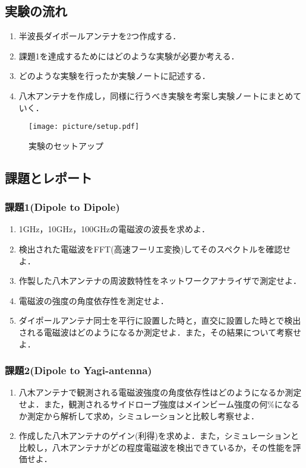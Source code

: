 \documentclass[a4j,10pt,oneside,openany]{jsbook}
\begin{document}
{\subsection{実験の流れ}
\begin{enumerate}[1．]
  \item 半波長ダイポールアンテナを2つ作成する．
  \item 課題1を達成するためにはどのような実験が必要か考える．
  \item どのような実験を行ったか実験ノートに記述する．
  \item 八木アンテナを作成し，同様に行うべき実験を考案し実験ノートにまとめていく．
\end{enumerate}

\begin{figure}[htbp]
  \begin{center}
    \texttt{[image: picture/setup.pdf]}
    \caption{実験のセットアップ}
    \label{fig:setup}
  \end{center}
\end{figure}

\subsection{課題とレポート}
\subsubsection{課題1(Dipole to Dipole)}
\begin{enumerate}[(1)]
  \item 1GHz，10GHz，100GHzの電磁波の波長を求めよ．
  \item 検出された電磁波をFFT(高速フーリエ変換)してそのスペクトルを確認せよ．
  \item 作製した八木アンテナの周波数特性をネットワークアナライザで測定せよ．
  \item 電磁波の強度の角度依存性を測定せよ．
  \item ダイポールアンテナ同士を平行に設置した時と，直交に設置した時とで検出される電磁波はどのようになるか測定せよ．また，その結果について考察せよ．
\end{enumerate}

\subsubsection{課題2(Dipole to Yagi-antenna)}
\begin{enumerate}[(1)]
  \item 八木アンテナで観測される電磁波強度の角度依存性はどのようになるか測定せよ．また，観測されるサイドローブ強度はメインビーム強度の何\%になるか測定から解析して求め，シミュレーションと比較し考察せよ．
  \item 作成した八木アンテナのゲイン(利得)を求めよ．また，シミュレーションと比較し，八木アンテナがどの程度電磁波を検出できているか，その性能を評価せよ．
\end{enumerate}

}
\end{document}
